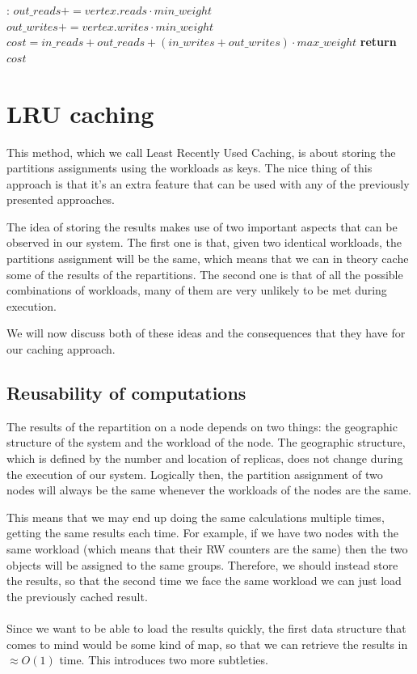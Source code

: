 	\begin{algorithm}
		\begin{algorithmic}[1]
        \Else:
          \State $out\_reads += vertex.reads \cdot min\_weight$
          \State $out\_writes += vertex.writes \cdot min\_weight$
        \EndIf
      \EndFor
      \State $cost = in\_reads+ out\_reads + (in\_writes+ out\_writes) \cdot max\_weight$
      \State \textbf{return} $cost$
  \EndFunction
  \end{algorithmic}
  \end{algorithm}

\section{LRU caching}\label{sec:lru-caching}
This method, which we call Least Recently Used Caching, is about storing the partitions assignments using the workloads as keys. The nice thing of this approach is that it's an extra feature that can be used with any of the previously presented approaches.

The idea of storing the results makes use of two important aspects that can be observed in our system. The first one is that, given two identical workloads, the partitions assignment will be the same, which means that we can in theory cache some of the results of the repartitions. The second one is that of all the possible combinations of workloads, many of them are very unlikely to be met during execution.

We will now discuss both of these ideas and the consequences that they have for our caching approach.

\subsection{Reusability of computations}\label{sec:Reusability-of-computations}
The results of the repartition on a node depends on two things: the geographic structure of the system and the workload of the node. The geographic structure, which is defined by the number and location of replicas, does not change during the execution of our system. Logically then, the partition assignment of two nodes will always be the same whenever the workloads of the nodes are the same.

This means that we may end up doing the same calculations multiple times, getting the same results each time. For example, if we have two nodes with the same workload (which means that their RW counters are the same) then the two objects will be assigned to the same groups. Therefore, we should instead store the results, so that the second time we face the same workload we can just load the previously cached result. 
\\\\
Since we want to be able to load the results quickly, the first data structure that comes to mind would be some kind of map, so that we can retrieve the results in $\approx O(1)$ time. This introduces two more subtleties.

